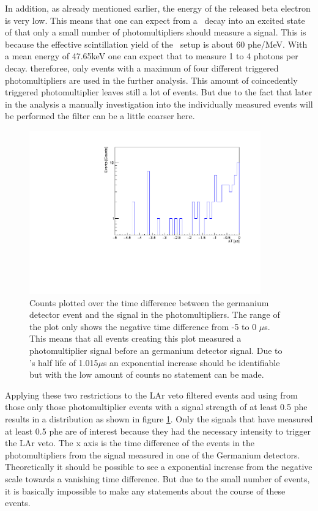 In addition, as already mentioned earlier, the energy of the released beta electron is very low.
This means that one can expect from a \Kr\ decay into an excited state of  that only a small number of photomultipliers should measure a signal.
This is because the effective scintillation yield of the \gerda\ setup is about 60 phe/MeV.
With a mean energy of 47.65keV one can expect that to measure 1 to 4 photons per decay.
thereforee, only events with a maximum of four different triggered photomultipliers are used in the further analysis.
This amount of coincedently triggered photomultiplier leaves still a lot of events.
But due to the fact that later in the analysis a manually investigation into the individually measured events will be performed the filter can be a little coarser here.
\\

\begin{figure}[t!]
	\centering
	\ifmakefigures%
	\includegraphics[width=100mm]{./Bilder/TriggerTimeOnly4.pdf}
	\fi%
	\caption{
	    Counts plotted over the time difference between the germanium detector event and the signal in the photomultipliers.
	    The range of the plot only shows the negative time difference from -5 to 0 $\mu$s.
	    This means that all events creating this plot measured a photomultiplier signal before an germanium detector signal.
	    Due to 's half life of 1.015$\mu$s an exponential increase should be identifiable but with the low amount of counts no statement can be made. 
	}
    	\label{fig:Trigger4}
\end{figure}

Applying these two restrictions to the LAr veto filtered events and using from those only those photomultiplier events with a signal strength of at least 0.5 phe results in a distribution as shown in figure \ref{fig:Trigger4}.
Only the signals that have measured at least 0.5 phe are of interest because they had the necessary intensity to trigger the LAr veto. 
The x axis is the time difference of the events in the photomultipliers from the signal measured in one of the Germanium detectors.
Theoretically it should be possible to see a exponential increase from the negative scale towards a vanishing time difference.
But due to the small number of events, it is basically impossible to make any statements about the course of these events.
\\

